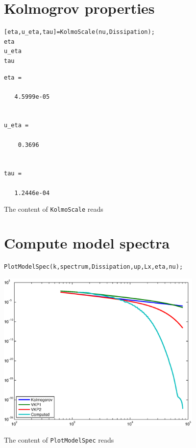 \documentclass[preprint,12pt,ntfdMod]{elsarticle}
\begin{document}
\section{Kolmogrov properties}

\begin{lstlisting}
[eta,u_eta,tau]=KolmoScale(nu,Dissipation);
eta
u_eta
tau
\end{lstlisting}

        \color{lightgray} \begin{lstlisting}
eta =

   4.5999e-05


u_eta =

    0.3696


tau =

   1.2446e-04

\end{lstlisting} \color{black}
    \begin{par}

The content of \verb|KolmoScale| reads


\end{par} \vspace{1em}


\section{Compute model spectra}

\begin{lstlisting}
PlotModelSpec(k,spectrum,Dissipation,up,Lx,eta,nu);
\end{lstlisting}

\includegraphics [width=4in]{spectrum_3d_01.eps}
\begin{par}

The content of \verb|PlotModelSpec| reads


\end{par} \vspace{1em}
\end{document}
